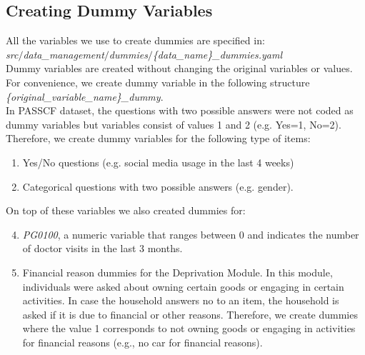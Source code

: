 \documentclass[11pt, a4paper, leqno]{article}
\begin{document}
\subsection{Creating Dummy Variables}
All the variables we use to create dummies are specified in:
\\  \emph{src$/$data\_management$/$dummies$/$\{data\_name\}\_dummies.yaml}\\
Dummy variables are created without changing the original variables or values. For convenience, we create dummy variable in the following structure  \emph{\{original\_variable\_name\}\_dummy}.\\[12pt]
In PASS\-CF dataset, the questions with two possible answers were not coded as dummy variables but variables consist of values 1 and 2 (e.g. Yes=1, No=2). Therefore, we create dummy variables for the following type of items:
\begin{enumerate}
\item  Yes/No questions (e.g. social media usage in the last 4 weeks)
\item Categorical questions with two possible answers (e.g. gender).
\end{enumerate}
On top of these variables we also created dummies for:
\begin{enumerate}
\setcounter{enumi}{3}
\item  \emph{PG0100}, a numeric variable that ranges between 0 and indicates the number of doctor visits in the last 3 months.
\item Financial reason dummies for the Deprivation Module. In this module, individuals were asked about owning certain goods or engaging in certain activities. In case the household answers no to an item, the household is asked if it is due to financial or other reasons. Therefore, we create dummies where the value 1 corresponds to not owning goods or engaging in activities for financial reasons (e.g., no car for financial reasons).
\end{enumerate}
\end{document}
